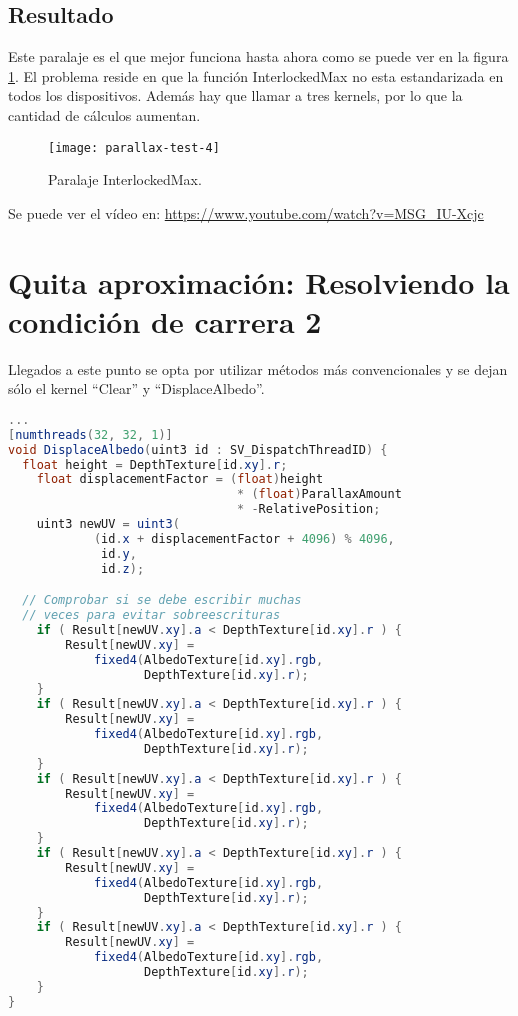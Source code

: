 \subsection{Resultado}
Este paralaje es el que mejor funciona hasta ahora como se puede ver en la figura \ref{fig:parallax-test-4}. El problema reside en que la función InterlockedMax no esta estandarizada en todos los dispositivos. Además hay que llamar a tres kernels, por lo que la cantidad de cálculos aumentan.

\begin{figure}[H]
  \centering
  \texttt{[image: parallax-test-4]}
  \caption{Paralaje InterlockedMax.}
  \label{fig:parallax-test-4}
\end{figure}
\FloatBarrier

Se puede ver el vídeo en: \url{https://www.youtube.com/watch?v=MSG_IU-Xcjc}


\section{Quita aproximación: Resolviendo la condición de carrera 2}
Llegados a este punto se opta por utilizar métodos más convencionales y se dejan sólo el kernel ``Clear'' y ``DisplaceAlbedo''.


\begin{lstlisting}[language=glsl]
...
[numthreads(32, 32, 1)]
void DisplaceAlbedo(uint3 id : SV_DispatchThreadID) {
  float height = DepthTexture[id.xy].r;
	float displacementFactor = (float)height 
	                            * (float)ParallaxAmount 
	                            * -RelativePosition;
	uint3 newUV = uint3(
	        (id.x + displacementFactor + 4096) % 4096, 
	         id.y, 
	         id.z);

  // Comprobar si se debe escribir muchas
  // veces para evitar sobreescrituras
	if ( Result[newUV.xy].a < DepthTexture[id.xy].r ) {
		Result[newUV.xy] = 
		    fixed4(AlbedoTexture[id.xy].rgb, 
		           DepthTexture[id.xy].r);
	}
	if ( Result[newUV.xy].a < DepthTexture[id.xy].r ) {
		Result[newUV.xy] = 
		    fixed4(AlbedoTexture[id.xy].rgb, 
		           DepthTexture[id.xy].r);
	}
	if ( Result[newUV.xy].a < DepthTexture[id.xy].r ) {
		Result[newUV.xy] = 
		    fixed4(AlbedoTexture[id.xy].rgb, 
		           DepthTexture[id.xy].r);
	}
	if ( Result[newUV.xy].a < DepthTexture[id.xy].r ) {
		Result[newUV.xy] = 
		    fixed4(AlbedoTexture[id.xy].rgb, 
		           DepthTexture[id.xy].r);
	}
	if ( Result[newUV.xy].a < DepthTexture[id.xy].r ) {
		Result[newUV.xy] = 
		    fixed4(AlbedoTexture[id.xy].rgb, 
		           DepthTexture[id.xy].r);
	}
}
\end{lstlisting}

